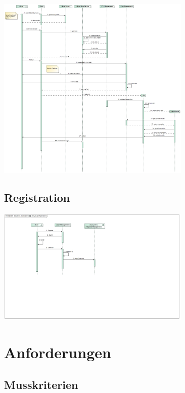 \documentclass[a4paper]{article}
\begin{document}
\includegraphics[width=350px]{sd-purchase.jpg}

\subsection{Registration}

\includegraphics[width=350px]{sd-registration.jpg}

\section{Anforderungen}

\subsection{Musskriterien}
\end{document}
